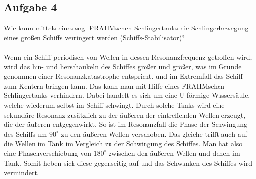 \documentclass[a4paper,10pt]{scrartcl}
\begin{document}
		\subsection{Aufgabe 4}
			Wie kann mittels eines sog. FRAHMschen Schlingertanks die Schlingerbewegung eines großen
			Schiffs verringert werden (Schiffs-Stabilisator)?\\
			\\
			Wenn ein Schiff periodisch von Wellen in dessen Resonanzfrequenz getroffen wird, wird das hin- und herschaukeln des Schiffes größer und größer, was im Grunde genommen einer Resonanzkatastrophe entspricht. und im Extremfall das Schiff zum Kentern bringen kann. Das kann man mit Hilfe eines FRAHMschen Schlingertanks verhindern. Dabei handelt es sich um eine U-förmige Wassersäule, welche wiederum selbst im Schiff schwingt. Durch solche Tanks wird eine sekundäre Resonanz zusätzlich zu der äußeren der eintreffenden Wellen erzeugt, die der äußeren entgegenwirkt. So ist im Resonanzfall die Phase der Schwingung des Schiffs um \(90^{\circ}\) zu den äußeren Wellen verschoben. Das gleiche trifft auch auf die Wellen im Tank im Vergleich zu der Schwingung des Schiffes. Man hat also eine Phasenverschiebung von \(180^{\circ}\) zwischen den äußeren Wellen und denen im Tank. Somit heben sich diese gegenseitig auf und das Schwanken des Schiffes wird vermindert.
\end{document}
